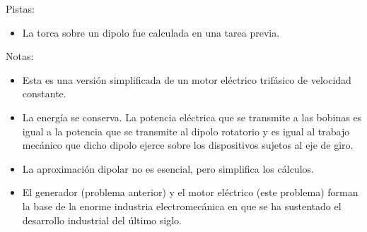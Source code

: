 \documentclass{exam}
\begin{document}
\begin{questions}
    Pistas:
    \begin{itemize}
    \item La torca sobre un dipolo fue calculada en una tarea previa.
    \end{itemize}

    Notas:
    \begin{itemize}
    \item Esta es una versión simplificada de un motor eléctrico
      trifásico de velocidad constante.
    \item La energía se conserva. La potencia eléctrica que se
      transmite a las bobinas es igual a la potencia que se transmite
      al dipolo rotatorio y es igual al trabajo mecánico que dicho
      dipolo ejerce sobre los dispositivos sujetos al eje de giro.
    \item La aproximación dipolar no es esencial, pero simplifica los
      cálculos.
    \item El generador (problema anterior) y el motor eléctrico (este problema)
      forman la base de la enorme industria electromecánica en que
      se ha sustentado el desarrollo industrial del último siglo.
    \end{itemize}





\end{questions}
\end{document}
